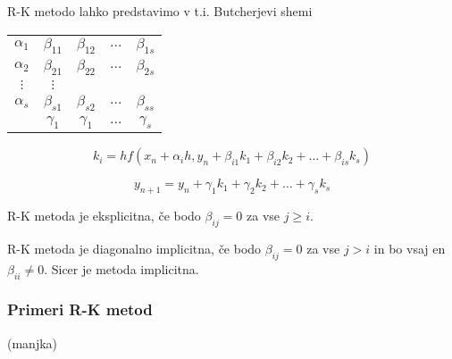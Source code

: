 \documentclass[a4paper,12pt]{article}
\theoremstyle{definition}
\theoremstyle{remark}
\newcounter{subsubsubsection}[subsubsection]
\begin{document}
R-K metodo lahko predstavimo v t.i. Butcherjevi shemi

\begin{center}
    \begin{tabular}{ c|c c c c }
        $\alpha_1$ & $\beta_{11}$ & $\beta_{12}$ & $\dots$ & $\beta_{1s}$ \\
        $\alpha_2$ & $\beta_{21}$ & $\beta_{22}$ & $\dots$ & $\beta_{2s}$ \\
        $\vdots$ & $\vdots$ \\
        $\alpha_s$ & $\beta_{s1}$ & $\beta_{s2}$ & $\dots$ & $\beta_{ss}$ \\
        \hline
        & $\gamma_1$ & $\gamma_1$ & $\dots$ & $\gamma_s$
    \end{tabular}
\end{center}


\begin{equation*}
    k_i = h f(x_n + \alpha_i h, y_n + \beta_{i1}k_1 + \beta_{i2}k_2 + \dots + \beta_{is}k_s)
\end{equation*}

\begin{equation*}
    y_{n+1} = y_n + \gamma_1 k_1 + \gamma_2 k_2 + \dots + \gamma_s k_s
\end{equation*}

R-K metoda je eksplicitna, če bodo $\beta_{ij} = 0$ za vse $j \geq i$.

R-K metoda je diagonalno implicitna, če bodo $\beta_{ij} = 0$ za vse $j > i$ in bo vsaj en $\beta_{ii} \neq 0$. Sicer je metoda implicitna.

\subsubsection{Primeri R-K metod}
(manjka)
%

\end{document}

